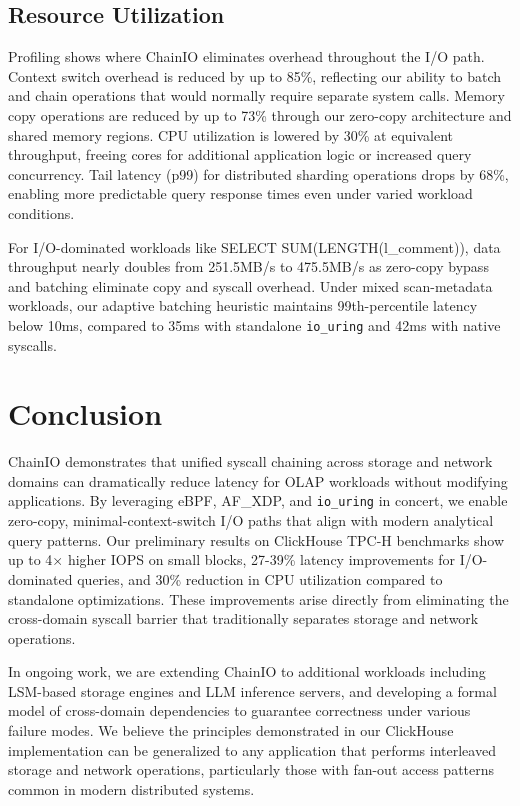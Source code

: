 \documentclass[sigconf,10pt]{acmart}
\newcommand{\sys}{ChainIO\xspace}
\begin{document}
\subsection{Resource Utilization}

Profiling shows where \sys eliminates overhead throughout the I/O path. Context switch overhead is reduced by up to 85\%, reflecting our ability to batch and chain operations that would normally require separate system calls. Memory copy operations are reduced by up to 73\% through our zero-copy architecture and shared memory regions. CPU utilization is lowered by 30\% at equivalent throughput, freeing cores for additional application logic or increased query concurrency. Tail latency (p99) for distributed sharding operations drops by 68\%, enabling more predictable query response times even under varied workload conditions.

For I/O-dominated workloads like SELECT SUM(LENGTH(l\_comment)), data throughput nearly doubles from 251.5MB/s to 475.5MB/s as zero-copy bypass and batching eliminate copy and syscall overhead. Under mixed scan-metadata workloads, our adaptive batching heuristic maintains 99th-percentile latency below 10ms, compared to 35ms with standalone \texttt{io\_uring} and 42ms with native syscalls.

\section{Conclusion}

\sys demonstrates that unified syscall chaining across storage and network domains can dramatically reduce latency for OLAP workloads without modifying applications. By leveraging eBPF, AF\_XDP, and \texttt{io\_uring} in concert, we enable zero-copy, minimal-context-switch I/O paths that align with modern analytical query patterns. Our preliminary results on ClickHouse TPC-H benchmarks show up to 4× higher IOPS on small blocks, 27-39\% latency improvements for I/O-dominated queries, and 30\% reduction in CPU utilization compared to standalone optimizations. These improvements arise directly from eliminating the cross-domain syscall barrier that traditionally separates storage and network operations.

In ongoing work, we are extending \sys to additional workloads including LSM-based storage engines and LLM inference servers, and developing a formal model of cross-domain dependencies to guarantee correctness under various failure modes. We believe the principles demonstrated in our ClickHouse implementation can be generalized to any application that performs interleaved storage and network operations, particularly those with fan-out access patterns common in modern distributed systems.



\end{document}
